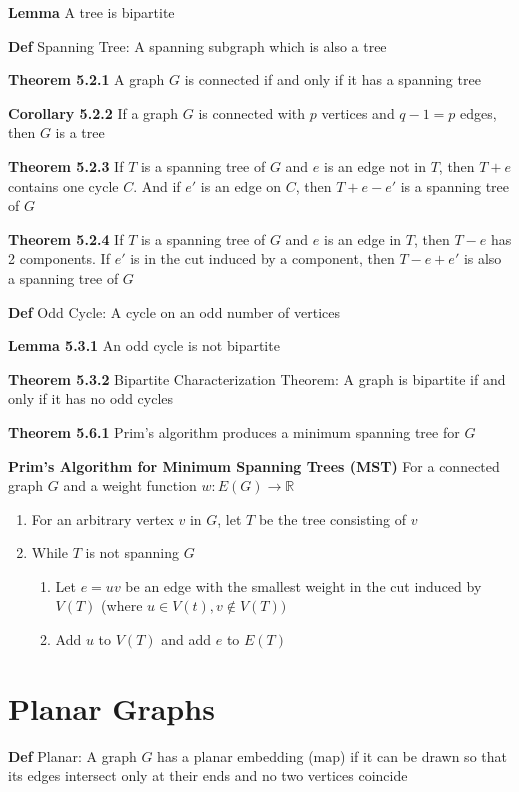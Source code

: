 \documentclass[11pt,notitlepage]{report}
\newcommand{\bb}[1]{\ensuremath{\mathbb{#1}}}
\newcommand{\tbf}[1]{\textbf{#1}}
\begin{document}
\tbf{Lemma} A tree is bipartite

\tbf{Def} Spanning Tree: A spanning subgraph which is also a tree

\tbf{Theorem 5.2.1} A graph $G$ is connected if and only if it has a spanning tree

\tbf{Corollary 5.2.2} If a graph $G$ is connected with $p$ vertices and $q-1 = p$ edges, then $G$ is a tree

\tbf{Theorem 5.2.3} If $T$ is a spanning tree of $G$ and $e$ is an edge not in $T$, then $T+e$ contains one cycle $C$. And if $e'$ is an edge on $C$, then $T+e - e'$ is a spanning tree of $G$

\tbf{Theorem 5.2.4} If $T$ is a spanning tree of $G$ and $e$ is an edge in $T$, then $T - e$ has 2 components. If $e'$ is in the cut induced by a component, then $T-e+e'$ is also a spanning tree of $G$

\tbf{Def} Odd Cycle: A cycle on an odd number of vertices

\tbf{Lemma 5.3.1} An odd cycle is not bipartite

\tbf{Theorem 5.3.2} Bipartite Characterization Theorem: A graph is bipartite if and only if it has no odd cycles

\tbf{Theorem 5.6.1} Prim's algorithm produces a minimum spanning tree for $G$

\tbf{Prim's Algorithm for Minimum Spanning Trees (MST)} For a connected graph $G$ and a weight function $w: E(G) \to \bb R$
\vspace{-3mm}
\begin{enumerate}
    \item For an arbitrary vertex $v$ in $G$, let $T$ be the tree consisting of $v$
    \vspace{-1.5mm}
    \item While $T$ is not spanning $G$
    \vspace{-2mm}
    \begin{enumerate}
        \item Let $e = uv$ be an edge with the smallest weight in the cut induced by $V(T)$ (where $u \in V(t), v \not \in V(T))$
        \item Add $u$ to $V(T)$ and add $e$ to $E(T)$
    \end{enumerate}
\end{enumerate}

\newpage
\section{Planar Graphs}
\vspace{-4mm}
\tbf{Def} Planar: A graph $G$ has a planar embedding (map) if it can be drawn so that its edges intersect only at their ends and no two vertices coincide
\end{document}
